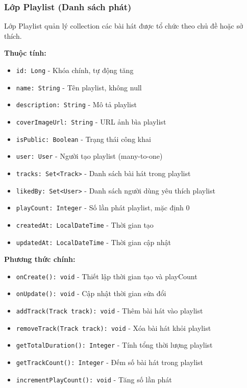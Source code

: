 \subsubsection{Lớp Playlist (Danh sách phát)}

Lớp Playlist quản lý collection các bài hát được tổ chức theo chủ đề hoặc sở thích.

\textbf{Thuộc tính:}
\begin{itemize}
    \item \texttt{id: Long} - Khóa chính, tự động tăng
    \item \texttt{name: String} - Tên playlist, không null
    \item \texttt{description: String} - Mô tả playlist
    \item \texttt{coverImageUrl: String} - URL ảnh bìa playlist
    \item \texttt{isPublic: Boolean} - Trạng thái công khai
    \item \texttt{user: User} - Người tạo playlist (many-to-one)
    \item \texttt{tracks: Set<Track>} - Danh sách bài hát trong playlist
    \item \texttt{likedBy: Set<User>} - Danh sách người dùng yêu thích playlist
    \item \texttt{playCount: Integer} - Số lần phát playlist, mặc định 0
    \item \texttt{createdAt: LocalDateTime} - Thời gian tạo
    \item \texttt{updatedAt: LocalDateTime} - Thời gian cập nhật
\end{itemize}

\textbf{Phương thức chính:}
\begin{itemize}
    \item \texttt{onCreate(): void} - Thiết lập thời gian tạo và playCount
    \item \texttt{onUpdate(): void} - Cập nhật thời gian sửa đổi
    \item \texttt{addTrack(Track track): void} - Thêm bài hát vào playlist
    \item \texttt{removeTrack(Track track): void} - Xóa bài hát khỏi playlist
    \item \texttt{getTotalDuration(): Integer} - Tính tổng thời lượng playlist
    \item \texttt{getTrackCount(): Integer} - Đếm số bài hát trong playlist
    \item \texttt{incrementPlayCount(): void} - Tăng số lần phát
\end{itemize}

